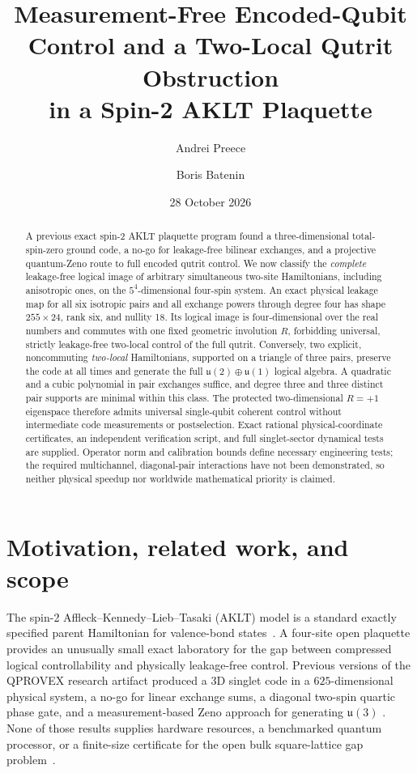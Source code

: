 \documentclass[aps,pra,twocolumn,nofootinbib,superscriptaddress,10pt]{revtex4-2}
\begin{document}
\title{Measurement-Free Encoded-Qubit Control and a Two-Local Qutrit Obstruction\\in a Spin-2 AKLT Plaquette}
\author{Andrei Preece}
\author{Boris Batenin}
\date{28 October 2026}
\begin{abstract}
A previous exact spin-2 AKLT plaquette program found a three-dimensional total-spin-zero ground code, a no-go for leakage-free bilinear exchanges, and a projective quantum-Zeno route to full encoded qutrit control. We now classify the \emph{complete} leakage-free logical image of arbitrary simultaneous two-site Hamiltonians, including anisotropic ones, on the $5^4$-dimensional four-spin system. An exact physical leakage map for all six isotropic pairs and all exchange powers through degree four has shape $255\times24$, rank six, and nullity 18. Its logical image is four-dimensional over the real numbers and commutes with one fixed geometric involution $R$, forbidding universal, strictly leakage-free two-local control of the full qutrit. Conversely, two explicit, noncommuting \emph{two-local} Hamiltonians, supported on a triangle of three pairs, preserve the code at all times and generate the full $\mathfrak u(2)\oplus\mathfrak u(1)$ logical algebra. A quadratic and a cubic polynomial in pair exchanges suffice, and degree three and three distinct pair supports are minimal within this class. The protected two-dimensional $R=+1$ eigenspace therefore admits universal single-qubit coherent control without intermediate code measurements or postselection. Exact rational physical-coordinate certificates, an independent verification script, and full singlet-sector dynamical tests are supplied. Operator norm and calibration bounds define necessary engineering tests; the required multichannel, diagonal-pair interactions have not been demonstrated, so neither physical speedup nor worldwide mathematical priority is claimed.
\end{abstract}
\maketitle
\section{Motivation, related work, and scope}
The spin-2 Affleck--Kennedy--Lieb--Tasaki (AKLT) model is a standard exactly specified parent Hamiltonian for valence-bond states~\cite{AKLT}. A four-site open plaquette provides an unusually small exact laboratory for the gap between compressed logical controllability and physically leakage-free control. Previous versions of the QPROVEX research artifact produced a 3D singlet code in a $625$-dimensional physical system, a no-go for linear exchange sums, a diagonal two-spin quartic phase gate, and a measurement-based Zeno approach for generating $\mathfrak u(3)$ \cite{V6,V8}. None of those results supplies hardware resources, a benchmarked quantum processor, or a finite-size certificate for the open bulk square-lattice gap problem~\cite{Problems,GPW}.
\end{document}
